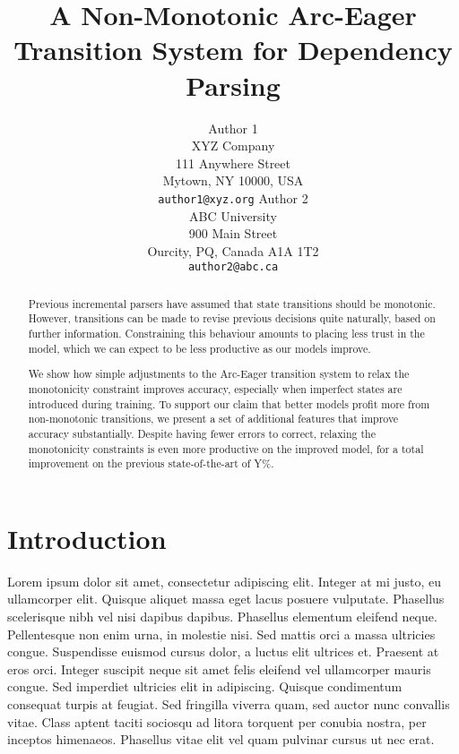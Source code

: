 \documentclass[11pt,letterpaper]{article}
\title{A Non-Monotonic Arc-Eager Transition System for Dependency Parsing}
\author{Author 1\\
	    XYZ Company\\
	    111 Anywhere Street\\
	    Mytown, NY 10000, USA\\
	    {\tt author1@xyz.org}
	  \And
	Author 2\\
  	ABC University\\
  	900 Main Street\\
  	Ourcity, PQ, Canada A1A 1T2\\
  {\tt author2@abc.ca}}
\date{}
\begin{document}
\maketitle
\begin{abstract}
    Previous incremental parsers have assumed that state transitions
    should be monotonic. However, transitions can be made to revise
    previous decisions quite naturally, based on further information.
    Constraining this behaviour amounts
    to placing less trust in the model, which we can expect to be less productive as
    our models improve.

    We show how simple adjustments to the Arc-Eager transition system to relax the
    monotonicity constraint improves accuracy, especially when imperfect
    states are introduced during training. To support our claim that better models
    profit more from non-monotonic transitions, we present a set of
    additional features that improve accuracy substantially. Despite having fewer errors
    to correct, relaxing the monotonicity constraints is even more productive on
    the improved model, for a total improvement on the previous state-of-the-art of
    Y\%.



\end{abstract}

\section{Introduction}
Lorem ipsum dolor sit amet, consectetur adipiscing elit. Integer at mi justo, eu ullamcorper elit. Quisque aliquet massa eget lacus posuere vulputate. Phasellus scelerisque nibh vel nisi dapibus dapibus. Phasellus elementum eleifend neque. Pellentesque non enim urna, in molestie nisi. Sed mattis orci a massa ultricies congue. Suspendisse euismod cursus dolor, a luctus elit ultrices et. Praesent at eros orci. Integer suscipit neque sit amet felis eleifend vel ullamcorper mauris congue. Sed imperdiet ultricies elit in adipiscing. Quisque condimentum consequat turpis at feugiat. Sed fringilla viverra quam, sed auctor nunc convallis vitae. Class aptent taciti sociosqu ad litora torquent per conubia nostra, per inceptos himenaeos. Phasellus vitae elit vel quam pulvinar cursus ut nec erat.
\end{document}
